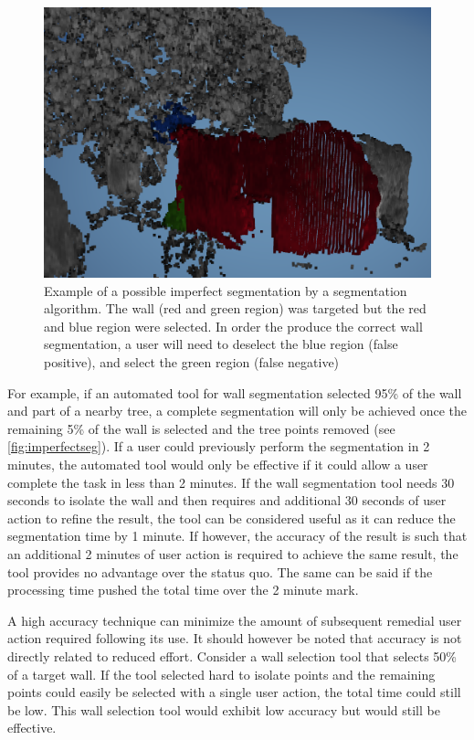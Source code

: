 \begin{figure}[ht]
  \centering
  \includegraphics[width=1\linewidth]{images/walltree.png}
  \caption[Imperfect segmentation]{Example of a possible imperfect segmentation by a segmentation algorithm. The wall (red and green region) was targeted but the red and blue region were selected. In order the produce the correct wall segmentation, a user will need to deselect the blue region (false positive), and select the green region (false negative) } 
  \label{fig:imperfectseg}
\end{figure}

For example, if an automated tool for wall segmentation selected 95\% of the wall and part of a nearby tree, a complete segmentation will only be achieved once the remaining 5\% of the wall is selected and the tree points removed (see \autoref{fig:imperfectseg}). If a user could previously perform the segmentation in 2 minutes, the automated tool would only be effective if it could allow a user complete the task in less than 2 minutes. If the wall segmentation tool needs 30 seconds to isolate the wall and then requires and additional 30 seconds of user action to refine the result, the tool can be considered useful as it can reduce the segmentation time by 1 minute. If however, the accuracy of the result is such that an additional 2 minutes of user action is required to achieve the same result, the tool provides no advantage over the status quo. The same can be said if the processing time pushed the total time over the 2 minute mark.

A high accuracy technique can minimize the amount of subsequent remedial user action required following its use. It should however be noted that accuracy is not directly related to reduced effort. Consider a wall selection tool that selects 50\% of a target wall. If the tool selected hard to isolate points and the remaining points could easily be selected with a single user action, the total time could still be low. This wall selection tool would exhibit low accuracy but would still be effective.



